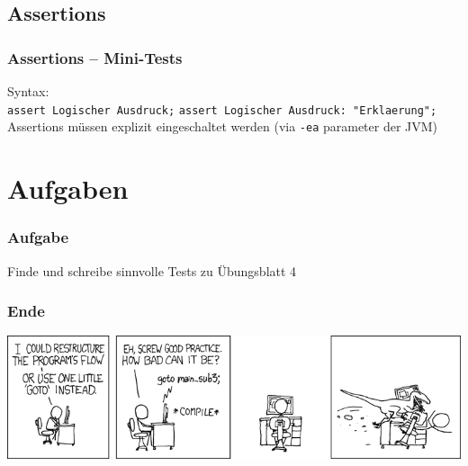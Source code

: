 \documentclass{beamer}
\begin{document}
\subsection{Assertions}
\begin{frame}[fragile]
\frametitle{Assertions -- Mini-Tests}
Syntax:\\
\verb|assert Logischer Ausdruck;|
\verb|assert Logischer Ausdruck: "Erklaerung";|\\
\pause
Assertions m\"{u}ssen explizit eingeschaltet werden (via \verb|-ea| parameter der JVM)
\end{frame}

\section{Aufgaben}
\begin{frame}
\frametitle{Aufgabe}
Finde und schreibe sinnvolle Tests zu \"{U}bungsblatt 4
\end{frame}

\begin{frame}
\frametitle{Ende}
\includegraphics[scale=5.0]{goto.png}
\end{frame}
\end{document}
